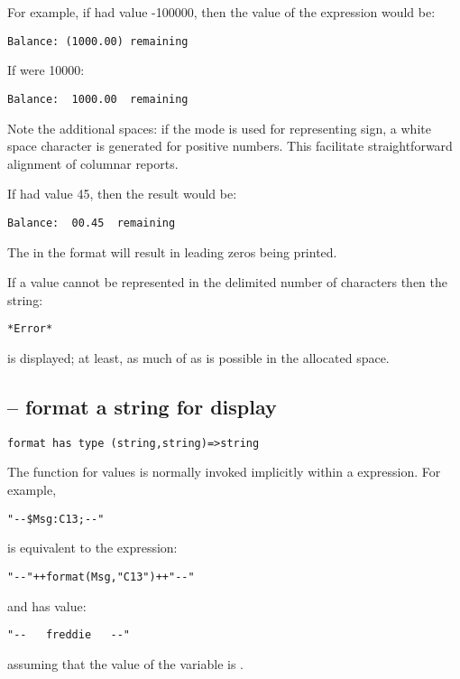 For example, if  had value -100000, then the value of the expression would be:
\begin{lstlisting}
Balance: (1000.00) remaining
\end{lstlisting}
If  were 10000:
\begin{lstlisting}
Balance:  1000.00  remaining
\end{lstlisting}
\begin{aside}
Note the additional spaces: if the   mode is used for representing sign, a white space character is generated for positive numbers. This facilitate straightforward alignment of columnar reports.
\end{aside}
If  had value 45, then the result would be:
\begin{lstlisting}
Balance:  00.45  remaining
\end{lstlisting}
The  in the format will result in leading zeros being printed.
\begin{aside}
If a value cannot be represented in the delimited number of characters then the string:
\begin{lstlisting}
*Error*
\end{lstlisting}
is displayed; at least, as much of  as is possible in the allocated space.\end{aside}


\subsection{ -- format a string for display}
\label{formatStringFunction}
\begin{lstlisting}
format has type (string,string)=>string
\end{lstlisting}

\begin{aside}
The  function for  values is normally invoked implicitly within a   expression. For example,
\begin{lstlisting}
"--$Msg:C13;--"
\end{lstlisting}
is equivalent to the expression:
\begin{lstlisting}
"--"++format(Msg,"C13")++"--"
\end{lstlisting}
and has value:
\begin{lstlisting}
"--   freddie   --"
\end{lstlisting}
assuming that the value of the  variable is .
\end{aside}

